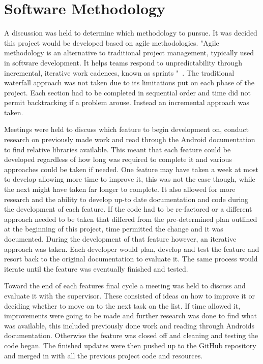 \pagebreak
\section{Software Methodology}
A discussion was held to determine which methodology to pursue. It was decided this project would be developed based on agile methodologies. "Agile methodology is an alternative to traditional project management, typically used in software development. It helps teams respond to unpredictability through incremental, iterative work cadences, known as sprints "~\cite{agile}. The traditional waterfall approach was not taken due to its limitations put on each phase of the project. Each section had to be completed in sequential order and time did not permit backtracking if a problem arouse. Instead an incremental approach was taken. 

Meetings were held to discuss which feature to begin development on, conduct research on previously made work and read through the Android documentation to find relative libraries available. This meant that each feature could be developed regardless of how long was required to complete it and various approaches could be taken if needed. One feature may have taken a week at most to develop allowing more time to improve it, this was not the case though, while the next might have taken far longer to complete. It also allowed for more research and the ability to develop up-to date documentation and code during the development of each feature. If the code had to be re-factored or a different approach needed to be taken that differed from the pre-determined plan outlined at the beginning of this project, time permitted the change and it was documented. During the development of that feature however, an iterative approach was taken. Each developer would plan, develop and test the feature and resort back to the original documentation to evaluate it. The same process would iterate until the feature was eventually finished and tested.

Toward the end of each features final cycle a meeting was held to discuss and evaluate it with the supervisor. These consisted of ideas on how to improve it or deciding whether to move on to the next task on the list. If time allowed it, improvements were going to be made and further research was done to find what was available, this included previously done work and reading through Androids documentation. Otherwise the feature was closed off and cleaning and testing the code began. The finished updates were then pushed up to the GitHub repository and merged in with all the previous project code and resources.

